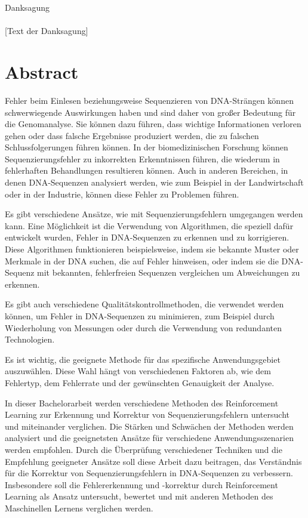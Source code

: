 \documentclass[oneside,bibliography=totocnumbered,BCOR=5mm]{scrbook}%
\theoremstyle{definition}
\theoremstyle{definition}
\theoremstyle{definition}
\theoremstyle{definition}
\theoremstyle{definition}
\theoremstyle{definition}
\begin{document}
\thispagestyle{empty}       %
\vspace*{2.2cm}
\noindent %
{\Huge Danksagung}\\
\vspace*{1.6cm} \\

[Text der Danksagung]

\newpage
\thispagestyle{empty}    

\section*{Abstract}
Fehler beim Einlesen beziehungsweise Sequenzieren von DNA-Strängen können schwerwiegende Auswirkungen haben und sind daher von großer Bedeutung für die Genomanalyse. 
Sie können dazu führen, dass wichtige Informationen verloren gehen oder dass falsche Ergebnisse produziert werden, die zu falschen Schlussfolgerungen führen können. 
In der biomedizinischen Forschung können Sequenzierungsfehler zu inkorrekten Erkenntnissen führen, die wiederum in fehlerhaften Behandlungen resultieren können. 
Auch in anderen Bereichen, in denen DNA-Sequenzen analysiert werden, wie zum Beispiel in der Landwirtschaft oder in der Industrie, 
können diese Fehler zu Problemen führen.

Es gibt verschiedene Ansätze, wie mit Sequenzierungsfehlern umgegangen werden kann.
Eine Möglichkeit ist die Verwendung von Algorithmen, die speziell dafür entwickelt wurden, 
Fehler in DNA-Sequenzen zu erkennen und zu korrigieren. 
Diese Algorithmen funktionieren beispielsweise, indem sie bekannte Muster oder Merkmale in der DNA suchen, 
die auf Fehler hinweisen, oder indem sie die DNA-Sequenz mit bekannten, 
fehlerfreien Sequenzen vergleichen um Abweichungen zu erkennen. 

Es gibt auch verschiedene Qualitätskontrollmethoden, die verwendet werden können, um Fehler in DNA-Sequenzen zu minimieren, 
zum Beispiel durch Wiederholung von Messungen oder durch die Verwendung von redundanten Technologien.

Es ist wichtig, die geeignete Methode für das spezifische Anwendungsgebiet auszuwählen. 
Diese Wahl hängt von verschiedenen Faktoren ab, wie dem Fehlertyp, dem Fehlerrate und der gewünschten Genauigkeit der Analyse.

In dieser Bachelorarbeit werden verschiedene Methoden des Reinforcement Learning 
zur Erkennung und Korrektur von Sequenzierungsfehlern untersucht und miteinander verglichen. 
Die Stärken und Schwächen der Methoden werden analysiert und die geeignetsten Ansätze für verschiedene Anwendungsszenarien werden empfohlen. 
Durch die Überprüfung verschiedener Techniken und die Empfehlung geeigneter Ansätze soll diese Arbeit dazu beitragen, 
das Verständnis für die Korrektur von Sequenzierungsfehlern in DNA-Sequenzen zu verbessern. 
Insbesondere soll die Fehlererkennung und -korrektur durch Reinforcement Learning als Ansatz 
untersucht, bewertet und mit anderen Methoden des Maschinellen Lernens verglichen werden.
\end{document}

